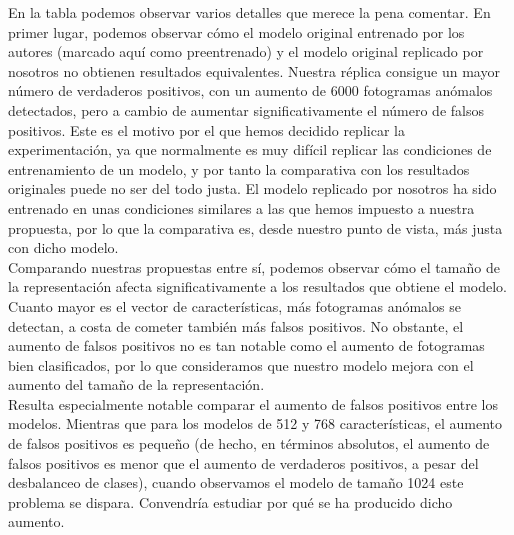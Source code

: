 \documentclass[../main.tex]{memoir}
\begin{document}
En la tabla podemos observar varios detalles que merece la pena
comentar. En primer lugar, podemos observar cómo el modelo original
entrenado por los autores (marcado aquí como preentrenado) y el modelo
original replicado por nosotros no obtienen resultados
equivalentes. Nuestra réplica consigue un mayor número de verdaderos
positivos, con un aumento de 6000 fotogramas anómalos detectados, pero
a cambio de aumentar significativamente el número de falsos
positivos. Este es el motivo por el que hemos decidido replicar la
experimentación, ya que normalmente es muy difícil replicar las
condiciones de entrenamiento de un modelo, y por tanto la comparativa
con los resultados originales puede no ser del todo justa. El modelo
replicado por nosotros ha sido entrenado en unas condiciones similares
a las que hemos impuesto a nuestra propuesta, por lo que la
comparativa es, desde nuestro punto de vista, más justa con dicho
modelo.\\

Comparando nuestras propuestas entre sí, podemos observar cómo el
tamaño de la representación afecta significativamente a los resultados
que obtiene el modelo. Cuanto mayor es el vector de características,
más fotogramas anómalos se detectan, a costa de cometer también más
falsos positivos. No obstante, el aumento de falsos positivos no es
tan notable como el aumento de fotogramas bien clasificados, por lo
que consideramos que nuestro modelo mejora con el aumento del tamaño
de la representación.\\

Resulta especialmente notable comparar el aumento de falsos positivos
entre los modelos. Mientras que para los modelos de 512 y 768
características, el aumento de falsos positivos es pequeño (de hecho,
en términos absolutos, el aumento de falsos positivos es menor que el
aumento de verdaderos positivos, a pesar del desbalanceo de clases),
cuando observamos el modelo de tamaño 1024 este problema se
dispara. Convendría estudiar por qué se ha producido dicho aumento.\\
\end{document}
